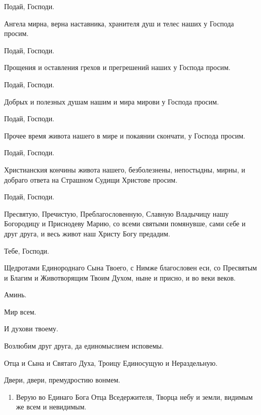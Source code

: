 \begin{mymulticols}
 Подай, Господи. 

 Ангела мирна, верна наставника, хранителя душ и телес наших у Господа просим. 

 Подай, Господи. 

 Прощения и оставления грехов и прегрешений наших у Господа просим. 

 Подай, Господи. 

 Добрых и полезных душам нашим и мира мирови у Господа просим. 

 Подай, Господи. 

 Прочее время живота нашего в мире и покаянии скончати, у Господа просим. 

 Подай, Господи. 

 Христианския кончины живота нашего, безболезнены, непостыдны, мирны, и добраго ответа на Страшном Судищи Христове просим. 

 Подай, Господи. 

 Пресвятую, Пречистую, Преблагословенную, Славную Владычицу нашу Богородицу и Приснодеву Марию, со всеми святыми помянувше, сами себе и друг друга, и весь живот наш Христу Богу предадим.

 Тебе, Господи.

 Щедротами Единороднаго Сына Твоего, с Нимже благословен еси, со Пресвятым и Благим и Животворящим Твоим Духом, ныне и присно, и во веки веков.

 Аминь.

 Мир всем.

 И духови твоему.

 Возлюбим друг друга, да единомыслием исповемы.

 Отца и Сына и Святаго Духа, Троицу Единосущую и Нераздельную.

 Двери, двери, премудростию вонмем. 




\begin{enumerate}

\item Верую во Единаго Бога Отца Вседержителя, Творца небу и земли, видимым же всем и невидимым. 


\end{enumerate}
\end{mymulticols}
